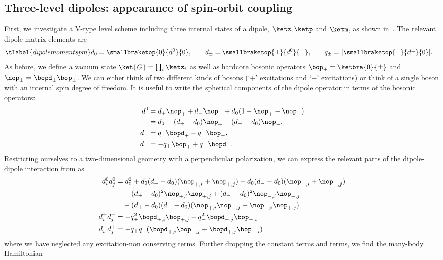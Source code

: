 \subsection{Three-level dipoles: appearance of spin-orbit coupling}
First, we investigate a \textsf{V}-type level scheme including three internal states of a dipole, $\ketz, \ketp$ and $\ketm$, as shown in~. The relevant dipole matrix elements are
\begin{align} \tlabel{dipolemomentspm}
    d_0 = \smallbraketop{0}{d^0}{0}, \qquad
    d_\pm = \smallbraketop{\pm}{d^0}{\pm}, \qquad
    q_\pm &= |\smallbraketop{\pm}{d^\pm}{0}|.
\end{align}
As before, we define a vacuum state $\ket{G}=\prod_i \ketz_i$ as well as hardcore bosonic operators $\bop_\pm=\ketbra{0}{{\pm}}$ and $\nop_{\pm}=\bopd_{\pm}\bop_{\pm}$. We can either think of two different kinds of bosons (`$+$' excitations and `$-$' excitations) or think of a single boson with an internal spin degree of freedom. It is useful to write the spherical components of the dipole operator in terms of the bosonic operators:
\begin{align}
    d^0 &= d_+ \nop_+ + d_- \nop_- + d_0 (1-\nop_+-\nop_-) \\
        &= d_0 + (d_+-d_0) \nop_+ + (d_--d_0) \nop_-, \\
    d^+ &= q_+ \bopd_+ - q_- \bop_-, \\
    d^- &= - q_+ \bop_+  + q_- \bopd_-.
\end{align}
Restricting ourselves to a two-dimensional geometry with a perpendicular polarization, we can express the relevant parts of the dipole-dipole interaction from  as
\begin{align}
    d^0_i d^0_j &= d_0^2 + d_0(d_+-d_0) (\nop_{+,i}+\nop_{+,j}) + d_0(d_--d_0) (\nop_{-,i}+\nop_{-,j}) \\
                &\quad + (d_+ - d_0)^2 \nop_{+,i} \nop_{+,j} + (d_- - d_0)^2 \nop_{-,i} \nop_{-,j} \\
                &\quad + (d_+ - d_0)(d_- - d_0) (\nop_{+,i} \nop_{-,j} + \nop_{-,i} \nop_{+,j}) \\
    d^+_i d^-_j &= - q_+^2 \bopd_{+,i} \bop_{+,j} - q_-^2 \bopd_{-,j} \bop_{-,i} \\
    d^+_i d^+_j &= - q_+q_- (\bopd_{+,i} \bop_{-,j} + \bopd_{+,j} \bop_{-,i})
\end{align}
where we have neglected any excitation-non conserving terms. Further dropping the constant terms and  terms, we find the many-body Hamiltonian

